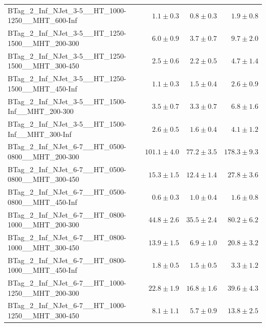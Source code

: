 \documentclass{beamer}
\begin{document}
\begin{frame}
\begin{tabular}{lrrr}
 BTag\_2\_Inf\_NJet\_3-5\_\_HT\_1000-1250\_\_MHT\_600-Inf &               $1.1\pm0.3$&               $0.8\pm0.3$&                   $1.9\pm0.8$ \\
 BTag\_2\_Inf\_NJet\_3-5\_\_HT\_1250-1500\_\_MHT\_200-300 &               $6.0\pm0.9$&               $3.7\pm0.7$&                   $9.7\pm2.0$ \\
 BTag\_2\_Inf\_NJet\_3-5\_\_HT\_1250-1500\_\_MHT\_300-450 &               $2.5\pm0.6$&               $2.2\pm0.5$&                   $4.7\pm1.4$ \\
 BTag\_2\_Inf\_NJet\_3-5\_\_HT\_1250-1500\_\_MHT\_450-Inf &               $1.1\pm0.3$&               $1.5\pm0.4$&                   $2.6\pm0.9$ \\
  BTag\_2\_Inf\_NJet\_3-5\_\_HT\_1500-Inf\_\_MHT\_200-300 &               $3.5\pm0.7$&               $3.3\pm0.7$&                   $6.8\pm1.6$ \\
  BTag\_2\_Inf\_NJet\_3-5\_\_HT\_1500-Inf\_\_MHT\_300-Inf &               $2.6\pm0.5$&               $1.6\pm0.4$&                   $4.1\pm1.2$ \\
 BTag\_2\_Inf\_NJet\_6-7\_\_HT\_0500-0800\_\_MHT\_200-300 &             $101.1\pm4.0$&              $77.2\pm3.5$&                 $178.3\pm9.3$ \\
 BTag\_2\_Inf\_NJet\_6-7\_\_HT\_0500-0800\_\_MHT\_300-450 &              $15.3\pm1.5$&              $12.4\pm1.4$&                  $27.8\pm3.6$ \\
 BTag\_2\_Inf\_NJet\_6-7\_\_HT\_0500-0800\_\_MHT\_450-Inf &               $0.6\pm0.3$&               $1.0\pm0.4$&                   $1.6\pm0.8$ \\
 BTag\_2\_Inf\_NJet\_6-7\_\_HT\_0800-1000\_\_MHT\_200-300 &              $44.8\pm2.6$&              $35.5\pm2.4$&                  $80.2\pm6.2$ \\
 BTag\_2\_Inf\_NJet\_6-7\_\_HT\_0800-1000\_\_MHT\_300-450 &              $13.9\pm1.5$&               $6.9\pm1.0$&                  $20.8\pm3.2$ \\
 BTag\_2\_Inf\_NJet\_6-7\_\_HT\_0800-1000\_\_MHT\_450-Inf &               $1.8\pm0.5$&               $1.5\pm0.5$&                   $3.3\pm1.2$ \\
 BTag\_2\_Inf\_NJet\_6-7\_\_HT\_1000-1250\_\_MHT\_200-300 &              $22.8\pm1.9$&              $16.8\pm1.6$&                  $39.6\pm4.3$ \\
 BTag\_2\_Inf\_NJet\_6-7\_\_HT\_1000-1250\_\_MHT\_300-450 &               $8.1\pm1.1$&               $5.7\pm0.9$&                  $13.8\pm2.5$ \\

\end{tabular}
\end{frame}
\end{document}
